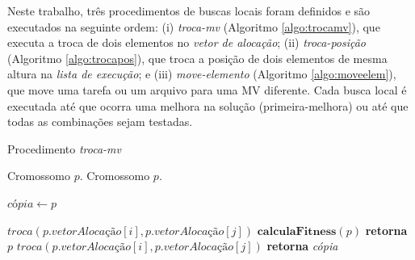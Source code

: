 Neste trabalho, três procedimentos de buscas locais foram definidos e são executados na seguinte ordem: (i) \textit{troca-mv} (Algoritmo \ref{algo:trocamv}), que executa a troca de dois elementos no \textit{vetor de alocação}; (ii) \textit{troca-posição} (Algoritmo \ref{algo:trocapos}), que troca a posição de dois elementos de mesma altura na \textit{lista de execução}; e (iii) \textit{move-elemento} (Algoritmo \ref{algo:moveelem}), que move uma tarefa ou um arquivo para uma MV diferente. Cada busca local é executada até que ocorra uma melhora na solução (primeira-melhora) ou até que todas as combinações sejam testadas.


\begin{algorithm}[H]
\caption{Procedimento \textit{troca-mv}}\label{algo:trocamv}

\begin{algorithmic}[1]
\Require Cromossomo $p$.
\Ensure Cromossomo $p$.
    
    \State $\textit{cópia} \gets p$
    
                \State $troca(p.\textit{vetorAlocação}[i], p.\textit{vetorAlocação}[j])$
                \State $\textbf{calculaFitness}(p)$ 
                    \State \textbf{retorna} $p$ 
                \Else
                    \State $troca(p.\textit{vetorAlocação}[i], p.\textit{vetorAlocação}[j])$ 
                \EndIf                
            \EndIf
        \EndFor
    \EndFor    
    \State \textbf{retorna} \textit{cópia}
\end{algorithmic}
\end{algorithm}

